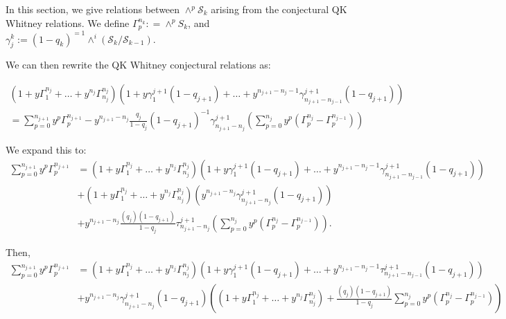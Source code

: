 \documentclass[12pt]{amsart}
\theoremstyle{remark}
\newcommand{\cS}{\mathcal{S}}
\newcommand{\F}[2]{\Gamma_{#1}^{#2}}
\newcommand{\TTau}[2]{\gamma_{#1}^{#2}}
\begin{document}
In this section, we give relations between $\wedge^p \cS_k$ arising from the conjectural QK Whitney relations. We define $\F{p}{n_k}: = \wedge^p S_k$, and $\TTau{j}{k}:= (1-q_k)^{=1}\wedge^i (\cS_k / \cS_{k-1})$. 

We can then rewrite the QK Whitney conjectural relations as:

\begin{equation*}
\begin{split}
    (1 + y\F{1}{n_j}+ \ldots + y^{n_j}\F{n_j}{n_j})
    \left(1 + y\TTau{1}{j+1}(1-q_{j+1}) + \ldots + y^{n_{j+1}-n_j-1}\TTau{n_{j+1} - n_{j-1}}{j+1}(1-q_{j+1}) \right) \\ 
    = \sum_{p=0}^{n_{j+1}} y^p \F{p}{n_{j+1}}
    -y^{n_{j+1} - n_j} \frac{q_j}{1-q_j}(1-q_{j+1})^{-1}
\TTau{n_{j+1}-n_j}{j+1}
\left( \sum_{p=0}^{n_j} y^p(\F{p}{n_j} 
- \F{p}{n_{j-1}}) \right)
\end{split}
\end{equation*}

We expand this to:
\begin{equation*}
\begin{split}
    \sum_{p=0}^{n_{j+1}} y^p \F{p}{n_{j+1}} &= (1 + y\F{1}{n_j} + \ldots + y^{n_j}\F{n_j}{n_j}) 
    \left(1 + y\TTau{1}{j+1}(1-q_{j+1}) + \ldots + y^{n_{j+1}-n_j-1} \TTau{n_{j+1} - n_{j-1}}{j+1}(1-q_{j+1}) \right) \\
    &+(1+y\F{1}{n_j} + \ldots + y^{n_j}\F{n_j}{n_j})\left(y^{n_{j+1}-n_j}\TTau{n_{j+1}-n_j}{j+1} (1-q_{j+1}) \right) \\
    &+ y^{n_{j+1} - n_j} \frac{(q_j)(1-q_{j+1})}{1-q_j}
\tau_{n_{j+1} - n_j}^{j+1} 
\left( \sum_{p=0}^{n_j} y^p(\F{p}{n_j} 
- \F{p}{n_{j-1}}) \right).
\end{split}
\end{equation*}

Then, 
\begin{equation*}
\begin{split}
    \sum_{p=0}^{n_{j+1}} y^p \F{p}{n_{j+1}} 
    &= (1 + y\F{1}{n_j} + \ldots + y^{n_j}\F{n_j}{n_j}) 
    \left(1 + y\TTau{1}{j+1}(1-q_{j+1}) + \ldots + y^{n_{j+1}-n_j-1} \tau_{n_{j+1} - n_{j-1}}^{j+1}(1-q_{j+1}) \right) \\
    &+ y^{n_{j+1}-n_j}\TTau{n_{j+1}-n_j}{j+1}(1-q_{j+1}) \left((1+y\F{1}{n_j} + \ldots + y^{n_j}\F{n_j}{n_j}) + \frac{(q_j)(1-q_{j+1})}{1-q_j}\sum_{p = 0}^{n_j} y^p(\F{p}{n_j} - \F{p}{n_{j-1}}) \right)
\end{split}
\end{equation*}
\end{document}
